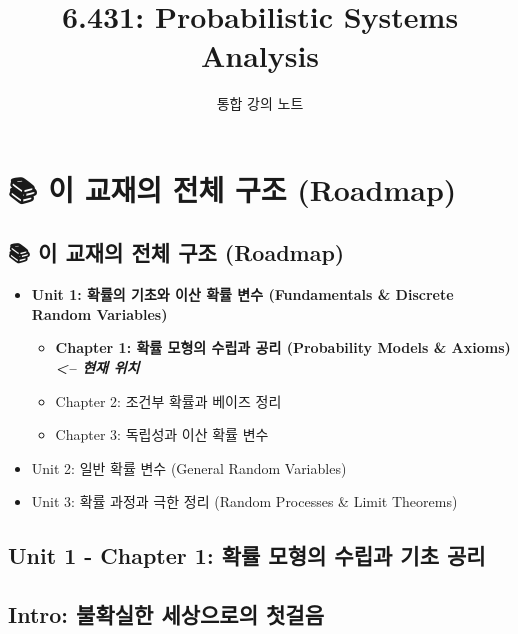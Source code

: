 \documentclass[11pt,a4paper]{book}
\title{\textbf{6.431: Probabilistic Systems Analysis}}
\author{통합 강의 노트}
\date{}
\newcommand{\chaptertitle}[2]{\section*{#1: #2}}
\theoremstyle{definition}
\begin{document}
\maketitle
\tableofcontents


\chapter{📚 이 교재의 전체 구조 (Roadmap)}
\label{ch:lecture1}



\section*{📚 이 교재의 전체 구조 (Roadmap)}
\begin{itemize}
    \item \textbf{Unit 1: 확률의 기초와 이산 확률 변수 (Fundamentals \& Discrete Random Variables)}
    \begin{itemize}
        \item[$\to$] \textbf{\textcolor{mainblue}{Chapter 1: 확률 모형의 수립과 공리 (Probability Models \& Axioms) \textit{<-- 현재 위치}}}
        \item Chapter 2: 조건부 확률과 베이즈 정리
        \item Chapter 3: 독립성과 이산 확률 변수
    \end{itemize}
    \item Unit 2: 일반 확률 변수 (General Random Variables)
    \item Unit 3: 확률 과정과 극한 정리 (Random Processes \& Limit Theorems)
\end{itemize}
\vspace{1cm}

\chaptertitle{Unit 1 - Chapter 1}{확률 모형의 수립과 기초 공리}

\section*{Intro: 불확실한 세상으로의 첫걸음}
\end{document}

